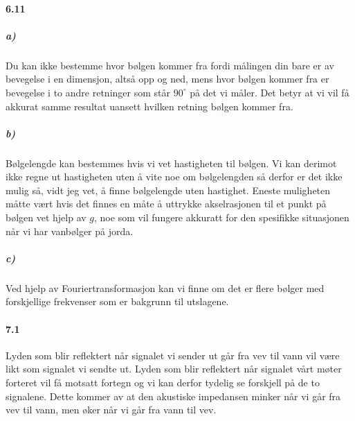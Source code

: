 \documentclass[11pt, A4paper,norsk]{article}
\begin{document}
		\paragraph{6.11}
			\subparagraph{a)}
				\begin{flushleft}
Du kan ikke bestemme hvor bølgen kommer fra fordi målingen din bare er av bevegelse i en dimensjon, altså opp og ned, mens hvor bølgen kommer fra er bevegelse i to andre retninger som står $90^{\circ}$ på det vi måler. Det betyr at vi vil få akkurat samme resultat uansett hvilken retning bølgen kommer fra.
				\end{flushleft}









			\subparagraph{b)}
				\begin{flushleft}
Bølgelengde kan bestemmes hvis vi vet hastigheten til bølgen. Vi kan derimot ikke regne ut hastigheten uten å vite noe om bølgelengden så derfor er det ikke mulig så, vidt jeg vet, å finne bølgelengde uten hastighet. Eneste muligheten måtte vært hvis det finnes en måte å uttrykke akselrasjonen til et punkt på bølgen vet hjelp av $g$, noe som vil fungere akkuratt for den spesifikke situasjonen når vi har vanbølger på jorda.
				\end{flushleft}
			









			\subparagraph{c)}
				\begin{flushleft}
Ved hjelp av Fouriertransformasjon kan vi finne om det er flere bølger med forskjellige frekvenser som er bakgrunn til utslagene.
				\end{flushleft}










		\paragraph{7.1}
			\begin{flushleft}
Lyden som blir reflektert når signalet vi sender ut går fra vev til vann vil være likt som signalet vi sendte ut. Lyden som blir reflektert når signalet vårt møter forteret vil få motsatt fortegn og vi kan derfor tydelig se forskjell på de to signalene. Dette kommer av at den akustiske impedansen minker når vi går fra vev til vann, men øker når vi går fra vann til vev.
			\end{flushleft}
\end{document}
